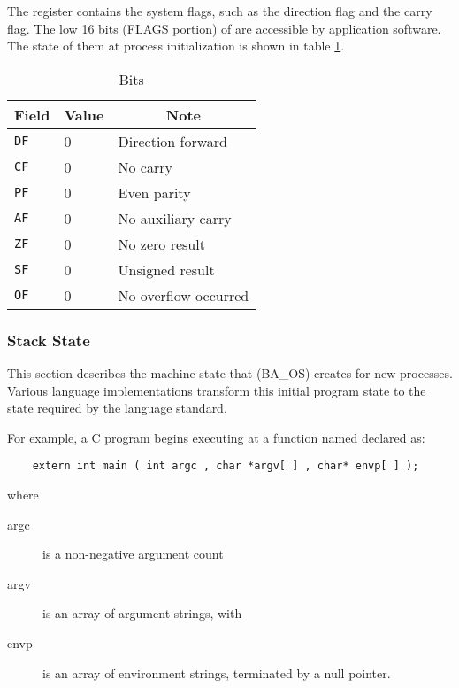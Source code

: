 The  register contains the system flags, such as the
direction flag and the carry flag.  The low 16 bits (FLAGS portion)
of  are accessible by
application software.  The state of them at process initialization
is shown in table \ref{rflags-status}.

\begin{table}[H]
\Hrule
  \caption{ Bits}
  \label{rflags-status}
  \begin{center}
    \begin{tabular}[t]{l|l|l}
      \multicolumn{1}{c}{Field} & \multicolumn{1}{c}{Value}& \multicolumn{1}{c}{Note} \\
      \hline
      \texttt{DF} & 0 & Direction forward\\
      \texttt{CF} & 0 & No carry\\
      \texttt{PF} & 0 & Even parity\\
      \texttt{AF} & 0 & No auxiliary carry\\
      \texttt{ZF} & 0 & No zero result\\
      \texttt{SF} & 0 & Unsigned result\\
      \texttt{OF} & 0 & No overflow occurred\\
    \end{tabular}
  \end{center}
\Hrule
\end{table}

\subsubsection{Stack State}

This section describes the machine state that (BA\_OS) creates
for new processes. Various language implementations transform this
initial program state to the state required by the language standard.

For example, a C program begins executing at a
function named  declared as:

\begin{footnotesize}
\begin{verbatim}
    extern int main ( int argc , char *argv[ ] , char* envp[ ] );
\end{verbatim}
\end{footnotesize}

where
\begin{description}
 \item[argc] is a non-negative argument count
 \item[argv] is an array of argument strings, with 
 \item[envp] is an array of environment strings,
             terminated by a null pointer.
\end{description}

